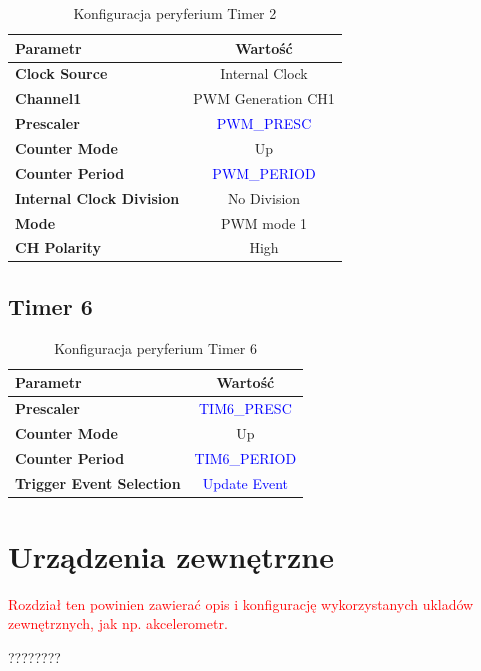 \documentclass[10pt, a4paper]{article}
\begin{document}
\begin{table}[H]
	\centering
	\begin{tabular}{|l|c|} \hline
		\textbf{Parametr} & Wartość \\
		\hline
		\hline  \textbf{Clock Source}&Internal Clock  \\\hline
		\textbf{Channel1} & PWM Generation CH1\\\hline
		\textbf{Prescaler} & \textcolor{blue}{PWM\_PRESC}\\\hline
		\textbf{Counter Mode} &  Up\\
		\hline
		\textbf{Counter Period}& \textcolor{blue}{PWM\_PERIOD}\\\hline
		\textbf{Internal Clock Division}& No Division\\
		\hline
		\textbf{Mode}& PWM mode 1\\
		\hline
		\textbf{CH Polarity}& High\\
		\hline
	\end{tabular}
	\caption{Konfiguracja peryferium Timer 2}
	\label{tab:Timer2}
\end{table}

\subsection{Timer 6}

\begin{table}[H]
	\centering
	\begin{tabular}{|l|c|} \hline
		\textbf{Parametr} & Wartość \\
		\hline
		\hline
		\textbf{Prescaler} & \textcolor{blue}{TIM6\_PRESC}\\\hline
		\textbf{Counter Mode} &  Up\\
		\hline
		\textbf{Counter Period}& \textcolor{blue}{TIM6\_PERIOD}\\\hline
		\textbf{Trigger Event Selection}& \textcolor{blue}{Update Event}\\
		\hline
	\end{tabular}
	\caption{Konfiguracja peryferium Timer 6}
	\label{tab:Timer6}
\end{table}
\section{Urządzenia zewnętrzne}
\textcolor{red}{Rozdział ten powinien zawierać opis i konfigurację wykorzystanych ukladów
	zewnętrznych, jak np. akcelerometr.}


????????
\end{document}
